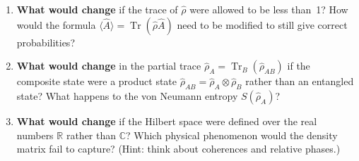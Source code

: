 \documentclass[11pt,a4paper]{article}
\begin{document}
\begin{tcolorbox}[ugconceptbox, title={Part II --- ``What Would Change If\ldots'' \hfill\normalfont 3 $\times$ 2 pts = 6 pts}]

\begin{enumerate}[leftmargin=1.8em, label=\textbf{Q\arabic*.}, itemsep=14pt, start=5]

\item {}
  \textbf{What would change} if the trace of $\hat{\rho}$ were allowed to be
  less than~1? How would the formula $\langle\hat{A}\rangle=\operatorname{Tr}(\hat{\rho}\hat{A})$
  need to be modified to still give correct probabilities?

  \vspace{2.5cm}

\item {}
  \textbf{What would change} in the partial trace
  $\hat{\rho}_A=\operatorname{Tr}_B(\hat{\rho}_{AB})$
  if the composite state were a product state
  $\hat{\rho}_{AB}=\hat{\rho}_A\otimes\hat{\rho}_B$
  rather than an entangled state?
  What happens to the von Neumann entropy $S(\hat{\rho}_A)$?

  \vspace{2.5cm}

\item {}
  \textbf{What would change} if the Hilbert space were defined over the
  real numbers $\mathbb{R}$ rather than $\mathbb{C}$?
  Which physical phenomenon would the density matrix fail to capture?
  (Hint: think about coherences and relative phases.)

  \vspace{2.5cm}

\end{enumerate}
\end{tcolorbox}
\end{document}
